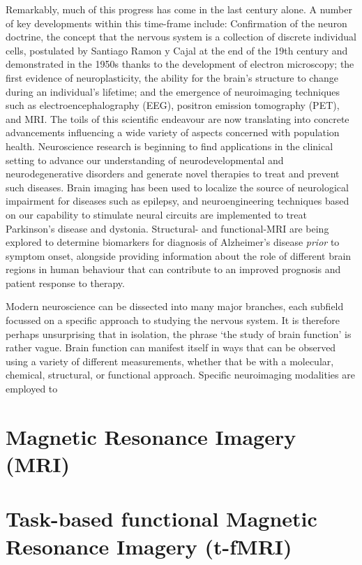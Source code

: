 Remarkably, much of this progress has come in the last century alone. A number of key developments within this time-frame include: Confirmation of the neuron doctrine, the concept that the nervous system is a collection of discrete individual cells, postulated by Santiago Ramon y Cajal at the end of the 19th century and demonstrated in the 1950s thanks to the development of electron microscopy; the first evidence of neuroplasticity, the ability for the brain's structure to change during an individual's lifetime; and the emergence of neuroimaging techniques such as electroencephalography (EEG), positron emission tomography (PET), and MRI. The toils of this scientific endeavour are now translating into concrete advancements influencing a wide variety of aspects concerned with population health. Neuroscience research is beginning to find applications in the clinical setting to advance our understanding of neurodevelopmental and neurodegenerative disorders and generate novel therapies to treat and prevent such diseases. Brain imaging has been used to localize the source of neurological impairment for diseases such as epilepsy, and neuroengineering techniques based on our capability to stimulate neural circuits are implemented to treat Parkinson's disease and dystonia. Structural- and functional-MRI are being explored to determine biomarkers for diagnosis of Alzheimer's disease \textit{prior} to symptom onset, alongside providing information about the role of different brain regions in human behaviour that can contribute to an improved prognosis and patient response to therapy.  

Modern neuroscience can be dissected into many major branches, each subfield focussed on a specific approach to studying the nervous system. It is therefore perhaps unsurprising that in isolation, the phrase `the study of brain function' is rather vague. Brain function can manifest itself in ways that can be observed using a variety of different measurements, whether that be with a molecular, chemical, structural, or functional approach. Specific neuroimaging modalities are employed to   

\section{Magnetic Resonance Imagery (MRI)}

\section{Task-based functional Magnetic Resonance Imagery (t-fMRI)}

